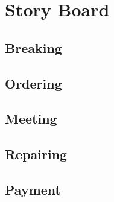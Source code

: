 \documentclass[final]{scrreprt} %
\begin{document}
\chapter{Story Board} %
\label{ch:storyboard}

\section{Breaking}

\section{Ordering}

\section{Meeting}

\section{Repairing}

\section{Payment}
\end{document}
